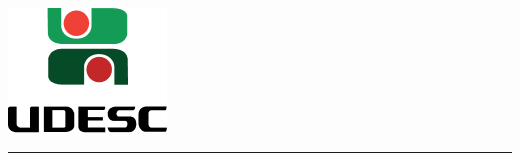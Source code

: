 \thispagestyle{empty}
\begin{center}
	\begin{minipage}[!]{\linewidth}
        \begin{minipage}[!]{.19\linewidth}
            \includegraphics[width=\linewidth]{img/logo.png}           
        \end{minipage}
        \begin{minipage}[!]{.8\linewidth}
            \center
            \ABNTEXchapterfont\normalsize\MakeUppercase{\imprimirinstituicao}
            \par
            \vspace*{3pt}                     
            \ABNTEXchapterfont\normalsize\MakeUppercase{\centro}
            \par
            \vspace*{3pt}
            \ABNTEXchapterfont\normalsize\MakeUppercase{\departamento}
            \par
            \vspace*{3pt}           
            \ABNTEXchapterfont\normalsize\MakeUppercase{\disciplina}
        \end{minipage}        
    \end{minipage}
    \par\vspace{0.5cm}
    \rule{\textwidth}{.5pt}   
\end{center}
